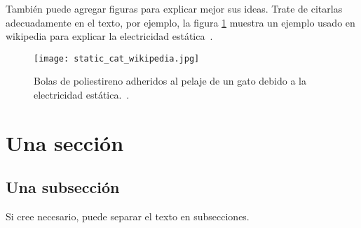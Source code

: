 \documentclass[../portafolio.tex]{subfiles}
\begin{document}
También puede agregar figuras para explicar mejor sus ideas. Trate de
citarlas adecuadamente en el texto, por ejemplo, la figura
\ref{fig:estatica} muestra un ejemplo usado en wikipedia
para explicar la electricidad estática~\cite{wikistatic}.

\begin{figure}[h!]
  \centering
  \texttt{[image: static\_cat\_wikipedia.jpg]}
  \caption{Bolas de poliestireno adheridos al pelaje de un gato debido
    a la electricidad estática.~\cite{wikistatic}.}
  \label{fig:estatica}
\end{figure}


\section{Una sección}
\subsection{Una subsección}
Si cree necesario, puede separar el texto en subsecciones.
\end{document}
